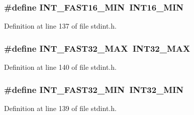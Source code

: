 \subsubsection[{\texorpdfstring{I\+N\+T\+\_\+\+F\+A\+S\+T16\+\_\+\+M\+IN}{INT_FAST16_MIN}}]{\setlength{\rightskip}{0pt plus 5cm}\#define I\+N\+T\+\_\+\+F\+A\+S\+T16\+\_\+\+M\+IN~{\bf I\+N\+T16\+\_\+\+M\+IN}}\hypertarget{lib-src_2ffmpeg_2win32_2stdint_8h_a169460a4e2a79138723d68d99372d958}{}\label{lib-src_2ffmpeg_2win32_2stdint_8h_a169460a4e2a79138723d68d99372d958}


Definition at line 137 of file stdint.\+h.

\subsubsection[{\texorpdfstring{I\+N\+T\+\_\+\+F\+A\+S\+T32\+\_\+\+M\+AX}{INT_FAST32_MAX}}]{\setlength{\rightskip}{0pt plus 5cm}\#define I\+N\+T\+\_\+\+F\+A\+S\+T32\+\_\+\+M\+AX~{\bf I\+N\+T32\+\_\+\+M\+AX}}\hypertarget{lib-src_2ffmpeg_2win32_2stdint_8h_ac96fa0f41b19e89f109e4f9913ca6635}{}\label{lib-src_2ffmpeg_2win32_2stdint_8h_ac96fa0f41b19e89f109e4f9913ca6635}


Definition at line 140 of file stdint.\+h.

\subsubsection[{\texorpdfstring{I\+N\+T\+\_\+\+F\+A\+S\+T32\+\_\+\+M\+IN}{INT_FAST32_MIN}}]{\setlength{\rightskip}{0pt plus 5cm}\#define I\+N\+T\+\_\+\+F\+A\+S\+T32\+\_\+\+M\+IN~{\bf I\+N\+T32\+\_\+\+M\+IN}}\hypertarget{lib-src_2ffmpeg_2win32_2stdint_8h_ad93df1652ed0635513d5efe4f1219926}{}\label{lib-src_2ffmpeg_2win32_2stdint_8h_ad93df1652ed0635513d5efe4f1219926}


Definition at line 139 of file stdint.\+h.

